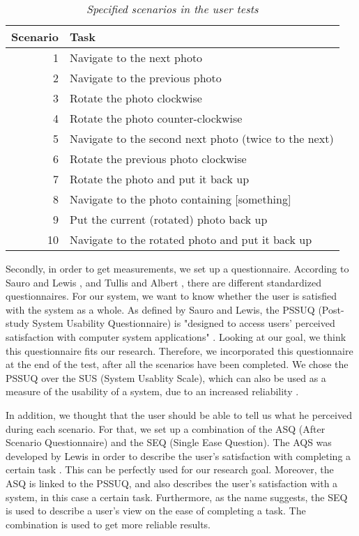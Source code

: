 \documentclass[11pt,a4paper]{article}
\begin{document}
\begin{table}
\begin{center}
\begin{tabular}{r|l}
\textbf{Scenario} & \textbf{Task} \\
\hline
1 & Navigate to the next photo \\ 
2 & Navigate to the previous photo \\
3 & Rotate the photo clockwise \\
4 & Rotate the photo counter-clockwise \\
5 & Navigate to the second next photo (twice to the next)\\ 
6 & Rotate the previous photo clockwise \\
7 & Rotate the photo and put it back up \\
8 & Navigate to the photo containing [something] \\
9 & Put the current (rotated) photo back up \\
10 & Navigate to the rotated photo and put it back up \\
\end{tabular}
\end{center}
\caption{\textit{Specified scenarios in the user tests}}
\label{tab:scen}
\end{table}



Secondly, in order to get measurements, we set up a questionnaire. According to Sauro and Lewis \cite{sauro2012quantifying}, and Tullis and Albert \cite{albert2013measuring}, there are different standardized questionnaires. For our system, we want to know whether the user is satisfied with the system as a whole. As defined by Sauro and Lewis, the PSSUQ (Post-study System Usability Questionnaire) is "designed to access users' perceived satisfaction with computer system applications" \cite{sauro2012quantifying}. Looking at our goal, we think this questionnaire fits our research. Therefore, we incorporated this questionnaire at the end of the test, after all the scenarios have been completed. We chose the PSSUQ over the SUS (System Usablity Scale), which can also be used as a measure of the usability of a system, due to an increased reliability \cite{sauro2012quantifying}.

In addition, we thought that the user should be able to tell us what he perceived during each scenario. For that, we set up a combination of the ASQ (After Scenario Questionnaire) and the SEQ (Single Ease Question). The AQS was developed by Lewis in order to describe the user's satisfaction with completing a certain task \cite{sauro2012quantifying}\cite{lewis1995ibm}. This can be perfectly used for our research goal. Moreover, the ASQ is linked to the PSSUQ, and also describes the user's satisfaction with a system, in this case a certain task. Furthermore, as the name suggests, the SEQ is used to describe a user's view on the ease of completing a task. The combination is used to get more reliable results.
\end{document}
